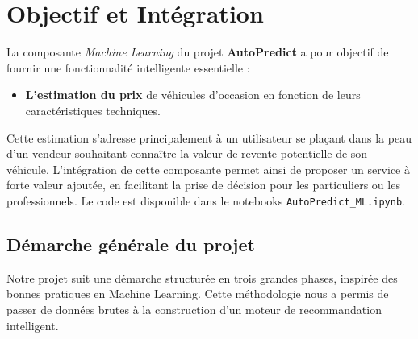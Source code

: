 \documentclass[12pt]{report}
\begin{document}
\thispagestyle{plain}
\pagestyle{plain}

\section{Objectif et Intégration}

La composante \textit{Machine Learning} du projet \textbf{AutoPredict} a pour objectif de fournir une fonctionnalité intelligente essentielle : 
\begin{itemize}
    \item \textbf{L'estimation du prix} de véhicules d'occasion en fonction de leurs caractéristiques techniques.
\end{itemize}

Cette estimation s'adresse principalement à un utilisateur se plaçant dans la peau d’un vendeur souhaitant connaître la valeur de revente potentielle de son véhicule. L’intégration de cette composante permet ainsi de proposer un service à forte valeur ajoutée, en facilitant la prise de décision pour les particuliers ou les professionnels.
Le code est disponible dans le notebooks \texttt{AutoPredict\_ML.ipynb}. 
\newline
\newline
\subsection{Démarche générale du projet}
Notre projet suit une démarche structurée en trois grandes phases, inspirée des bonnes pratiques en Machine Learning. Cette méthodologie nous a permis de passer de données brutes à la construction d'un moteur de recommandation intelligent.
\end{document}

